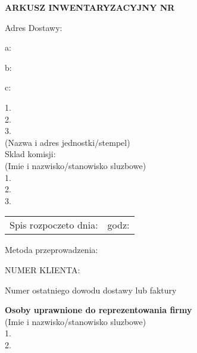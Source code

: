 \documentclass[8pt]{article}
\begin{document}
\begin{center}
{\large{\bf ARKUSZ INWENTARYZACYJNY NR}}
\end{center}

\begin{multicols}{2}

Adres Dostawy:

a: 

b: 

c: 

\vspace{10mm}

1. \dotfill \\


2. \dotfill \\


3. \dotfill \\

\vspace{-5mm}
{\tiny(Nazwa i adres jednostki/stempel)} \\

Sklad komisji: \\
{\tiny (Imie i nazwisko/stanowisko sluzbowe)} \\

1. \dotfill \\


2. \dotfill \\


3. \dotfill \\

\begin{tabularx}{\textwidth}{l l}
Spis rozpoczeto dnia: \dotfill & godz: \dotfill \\
\end{tabularx}

\columnbreak

Metoda przeprowadzenia: 

NUMER KLIENTA: 

\vspace{30mm}

Numer ostatniego dowodu dostawy lub faktury \dotfill

\vspace{5mm}

{\bf Osoby uprawnione do reprezentowania firmy}\\
{\tiny(Imie i nazwisko/stanowisko sluzbowe)} \\

1. \dotfill \\

2. \dotfill \\

\end{multicols}
\end{document}
